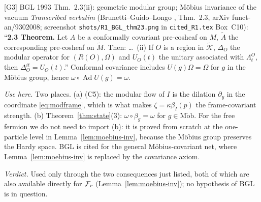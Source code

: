 \documentclass[11pt]{article}
\newcommand{\Mob}{\operatorname{M\ddot ob}}
\newcommand{\bI}{\beta_I}
\newcommand{\Fr}{\cF_r}
\newcommand{\Ad}{\operatorname{Ad}}
\theoremstyle{definition}\newtheorem{example}[theorem]{Example}
\begin{document}
\begin{citedbox}{[G3] BGL 1993 Thm.~2.3(ii): geometric modular group; M\"obius invariance of the
vacuum}
\emph{Transcribed verbatim} (Brunetti--Guido--Longo \cite{BGL}, Thm.~2.3, arXiv
funct-an/9302008; screenshot \texttt{shots/R1\_BGL\_thm23.png} in \texttt{cited\_R1.tex} Box~C10):
``\textbf{2.3 Theorem.} Let $A$ be a conformally covariant pre-cosheaf on $M$, $\widetilde A$ the
corresponding pre-cosheaf on $\widetilde M$.  Then: \dots\ (ii) If $O$ is a region in
$\widetilde{\mathcal K}$, $\Delta_O$ the modular operator for $(R(O),\Omega)$ and $U_O(t)$ the
unitary associated with $\Lambda^O_t$, then $\Delta^{it}_O=U_O(t)$.''  Conformal covariance
includes $U(g)\Omega=\Omega$ for $g$ in the M\"obius group, hence
$\omega\circ\Ad U(g)=\omega$.

\emph{Use here.}  Two places.  (a) (C5): the modular flow of $I$ is the dilation
$\partial_y$ in the coordinate \eqref{eq:modframe}, which is what makes $\zeta=\kappa\bI(p)$ the
frame-covariant strength.  (b) Theorem~\ref{thm:state}(3): $\omega\circ\beta_g=\omega$ for
$g\in\Mob$.  For the free fermion we do not need to import (b): it is proved from scratch at the
one-particle level in Lemma~\ref{lem:moebius-inv}, because the M\"obius group preserves the Hardy
space.  BGL is cited for the general Möbius-covariant net, where Lemma~\ref{lem:moebius-inv} is
replaced by the covariance axiom.

\emph{Verdict.}  Used only through the two consequences just listed, both of which are also
available directly for $\Fr$ (Lemma~\ref{lem:moebius-inv}); no hypothesis of BGL is in question.

\smallskip\noindent{}
\end{citedbox}
\end{document}
